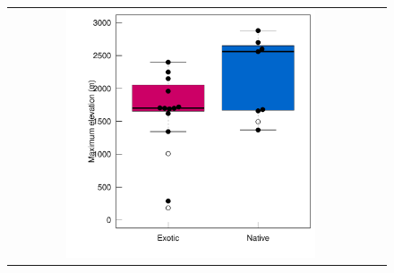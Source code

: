 \documentclass{article}
\begin{document}
\begin{figure}
\begin{tabular}{cc}
\includegraphics[width=0.7\textwidth]{figures/zoizos-boxmax}
\end{tabular}
\caption{\label{boxrange}}
\end{figure}

\clearpage
\end{document}
